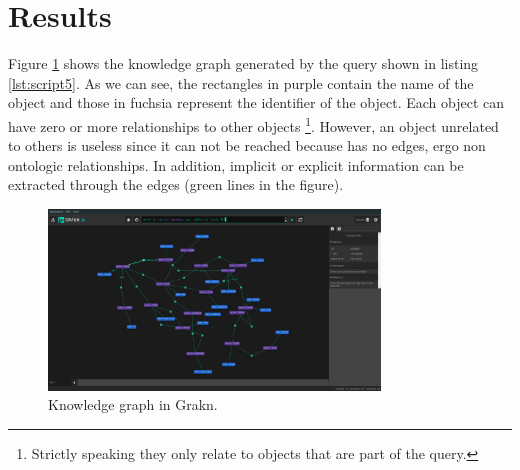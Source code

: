 \section{Results}
\label{sec:results}
Figure \ref{fig:grafGra} shows the knowledge graph generated by the query shown 
in listing \ref{lst:script5}. As we can see, the rectangles in purple 
contain the name of the object and those in fuchsia represent the identifier of 
the object. Each object can have zero or more relationships to other objects
\footnote{Strictly speaking they only relate to objects that are part of the 
query.}. However, an object unrelated to others is useless since it can
not be reached because has no edges, ergo non ontologic relationships. 
In addition, implicit or explicit information can be extracted through the 
edges (green lines in the figure).



\begin{figure}[H]
    \centering
    \includegraphics[width=8.8cm]{figures/allrel.png}
    \caption{Knowledge graph in Grakn.}
    \label{fig:grafGra}
\end{figure}

